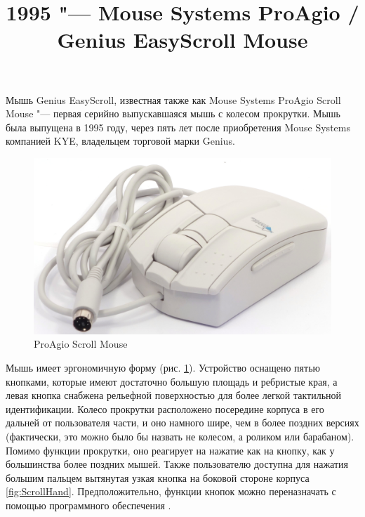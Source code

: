 \documentclass[11pt, a4paper]{article}
\begin{document}
\title{1995 "--- Mouse Systems ProAgio / Genius EasyScroll Mouse}
\date{}
\maketitle
{}
Мышь Genius EasyScroll, известная также как Mouse Systems ProAgio Scroll Mouse "--- первая серийно выпускавшаяся мышь с колесом прокрутки. Мышь была выпущена в 1995 году, через пять лет после приобретения Mouse Systems компанией KYE, владельцем торговой марки Genius.

\begin{figure}[h]
    \centering
    \includegraphics[scale=0.5]{1995_pro_agio_scroll_mouse/pic_30.jpg}
    \caption{ProAgio Scroll Mouse}
    \label{fig:ScrollPic}
\end{figure}


Мышь имеет эргономичную форму (рис. \ref{fig:ScrollPic}). Устройство оснащено пятью кнопками, которые имеют достаточно большую площадь и ребристые края, а левая кнопка снабжена рельефной поверхностью для более легкой тактильной идентификации. Колесо прокрутки расположено посередине корпуса в его дальней от пользователя части, и оно намного шире, чем в более поздних версиях (фактически, это можно было бы назвать не колесом, а роликом или барабаном). Помимо функции прокрутки, оно реагирует на нажатие как на кнопку, как у большинства более поздних мышей. Также пользователю доступна для нажатия большим пальцем вытянутая узкая кнопка на боковой стороне корпуса \ref{fig:ScrollHand}. Предположительно, функции кнопок можно переназначать с помощью программного обеспечения \cite{yt}.
\end{document}
